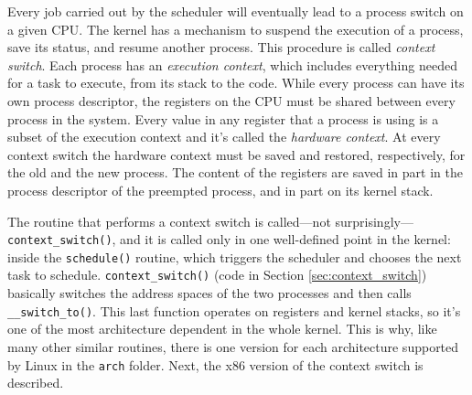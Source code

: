 Every job carried out by the scheduler will eventually lead to a process switch on a given CPU. The kernel has a mechanism to suspend the execution of a process, save its status, and resume another process. This procedure is called \textit{context switch}. Each process has an \textit{execution context}, which includes everything needed for a task to execute, from its stack to the code. While every process can have its own process descriptor, the registers on the CPU must be shared between every process in the system. Every value in any register that a process is using is a subset of the execution context and it's called the \textit{hardware context}. At every context switch the hardware context must be saved and restored, respectively, for the old and the new process. The content of the registers are saved in part in the process descriptor of the preempted process, and in part on its kernel stack.

The routine that performs a context switch is called---not surprisingly---\verb|context_switch()|, and it is called only in one well-defined point in the kernel: inside the \verb|schedule()| routine, which triggers the scheduler and chooses the next task to schedule. \verb|context_switch()| (code in Section \ref{sec:context_switch}) basically switches the address spaces of the two processes and then calls \verb|__switch_to()|. This last function operates on registers and kernel stacks, so it's one of the most architecture dependent in the whole kernel. This is why, like many other similar routines, there is one version for each architecture supported by Linux in the \verb|arch| folder. Next, the x86 version of the context switch is described.

